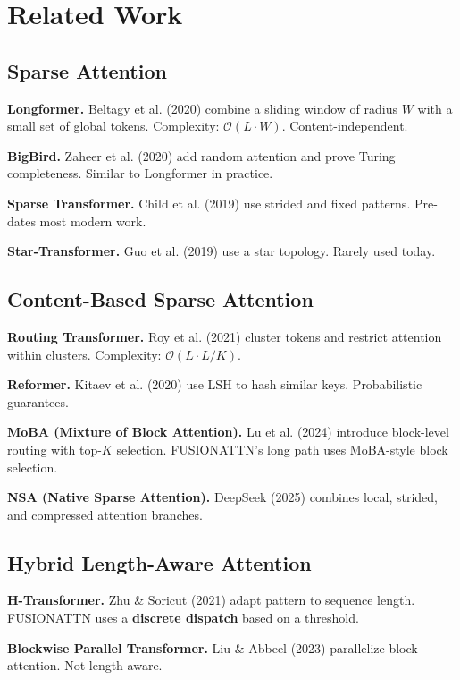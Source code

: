 \section{Related Work}

\subsection{Sparse Attention}

\textbf{Longformer.} Beltagy et al. (2020) combine a sliding window of radius $W$ 
with a small set of global tokens. Complexity: $\mathcal{O}(L \cdot W)$. 
Content-independent.

\textbf{BigBird.} Zaheer et al. (2020) add random attention and prove Turing 
completeness. Similar to Longformer in practice.

\textbf{Sparse Transformer.} Child et al. (2019) use strided and fixed patterns. 
Pre-dates most modern work.

\textbf{Star-Transformer.} Guo et al. (2019) use a star topology. Rarely used 
today.

\subsection{Content-Based Sparse Attention}

\textbf{Routing Transformer.} Roy et al. (2021) cluster tokens and restrict 
attention within clusters. Complexity: $\mathcal{O}(L \cdot L/K)$.

\textbf{Reformer.} Kitaev et al. (2020) use LSH to hash similar keys. Probabilistic 
guarantees.

\textbf{MoBA (Mixture of Block Attention).} Lu et al. (2024) introduce block-level 
routing with top-$K$ selection. FUSIONATTN's long path uses MoBA-style 
block selection.

\textbf{NSA (Native Sparse Attention).} DeepSeek (2025) combines local, strided, 
and compressed attention branches.

\subsection{Hybrid Length-Aware Attention}

\textbf{H-Transformer.} Zhu \& Soricut (2021) adapt pattern to sequence length. 
FUSIONATTN uses a \textbf{discrete dispatch} based on a threshold.

\textbf{Blockwise Parallel Transformer.} Liu \& Abbeel (2023) parallelize block 
attention. Not length-aware.

